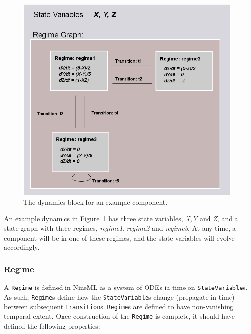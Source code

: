 \documentclass{article}
\newcommand{\nmlClass}[1]{{\tt #1}}
\begin{document}
\begin{figure}[htb!]
\center
\includegraphics[width=14cm]{images/SimpleRegimeGraph.png}
\protect\caption{The dynamics block for an example component.}
\label{SimpleRegimeGraph}
\end{figure}

An example dynamics in Figure~\ref{SimpleRegimeGraph} has three state variables,
\emph{X,Y} and \emph{Z}, and a state graph with three regimes, \emph{regime1},
\emph{regime2} and \emph{regime3}. At any time, a component will be in one of
these regimes, and the state variables will evolve accordingly.

\subsubsection{Regime}

A \nmlClass{Regime} is defined in NineML as a system of ODEs in time on
{\tt StateVariable}s.  As such, {\tt Regime}s define how the
{\tt StateVariable}s change (propagate in time) between subsequent
\nmlClass{Transition}s. {\tt Regime}s are defined to have non-vanishing
temporal extent. Once construction of the {\tt Regime} is complete, it should
have defined the following properties:
\end{document}
